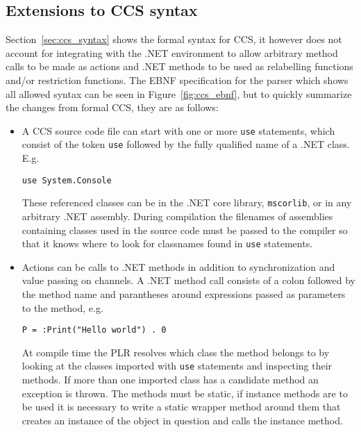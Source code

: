 \subsection{Extensions to CCS syntax}

	Section~\ref{sec:ccs_syntax} shows the formal syntax for CCS, it however 
	does not account for integrating with the .NET environment to allow 
	arbitrary method calls to be made as actions and .NET methods to be used as 
	relabelling functions and/or restriction functions. The EBNF specification 
	for the parser which shows all allowed syntax can be seen in 
	Figure~\ref{fig:ccs_ebnf}, but to quickly summarize the changes from formal 
	CCS, they are as follows:
	
	\begin{itemize}
		
		\item A CCS source code file can start with one or more \texttt{use} 
		statements, which consist of the token \texttt{use} followed by the fully 
		qualified name of a .NET class. E.g.
		
		\begin{center}\texttt{use System.Console}\end{center}
		
		These referenced classes can be in the .NET core library, 
		\texttt{mscorlib}, or in any arbitrary .NET assembly. During compilation 
		the filenames of assemblies containing classes used in the source code 
		must be passed to the compiler so that it knows where to look for 
		classnames found in \texttt{use} statements.
	
		\item Actions can be calls to .NET methods in addition to synchronization 
		and value passing on channels. A .NET method call consists of a colon 
		followed by the method name and parantheses around expressions passed as 
		parameters to the method, e.g. 
		
		\begin{center}\texttt{P = :Print("Hello world") . 0}\end{center}
		
		At compile time the PLR resolves which class the method belongs to by 
		looking at the classes imported with \texttt{use} statements and 
		inspecting their methods. If more than one imported class has a candidate 
		method an exception is thrown. The methods must be static, if instance 
		methods are to be used it is necessary to write a static wrapper method 
		around them that creates an instance of the object in question and calls 
		the instance method.
		

\end{itemize}

